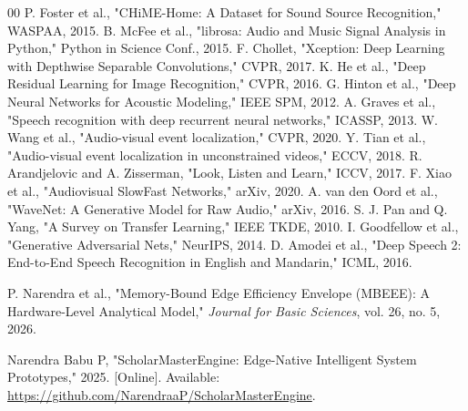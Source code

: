 \documentclass[conference]{IEEEtran}
\begin{document}
\begin{thebibliography}{00}
 P. Foster et al., "CHiME-Home: A Dataset for Sound Source Recognition," WASPAA, 2015.
 B. McFee et al., "librosa: Audio and Music Signal Analysis in Python," Python in Science Conf., 2015.
 F. Chollet, "Xception: Deep Learning with Depthwise Separable Convolutions," CVPR, 2017.
 K. He et al., "Deep Residual Learning for Image Recognition," CVPR, 2016.
 G. Hinton et al., "Deep Neural Networks for Acoustic Modeling," IEEE SPM, 2012.
 A. Graves et al., "Speech recognition with deep recurrent neural networks," ICASSP, 2013.
 W. Wang et al., "Audio-visual event localization," CVPR, 2020.
 Y. Tian et al., "Audio-visual event localization in unconstrained videos," ECCV, 2018.
 R. Arandjelovic and A. Zisserman, "Look, Listen and Learn," ICCV, 2017.
 F. Xiao et al., "Audiovisual SlowFast Networks," arXiv, 2020.
 A. van den Oord et al., "WaveNet: A Generative Model for Raw Audio," arXiv, 2016.
 S. J. Pan and Q. Yang, "A Survey on Transfer Learning," IEEE TKDE, 2010.
 I. Goodfellow et al., "Generative Adversarial Nets," NeurIPS, 2014.
 D. Amodei et al., "Deep Speech 2: End-to-End Speech Recognition in English and Mandarin," ICML, 2016.

 P. Narendra et al., "Memory-Bound Edge Efficiency Envelope (MBEEE): A Hardware-Level Analytical Model," \textit{Journal for Basic Sciences}, vol. 26, no. 5, 2026.

Narendra Babu P, "ScholarMasterEngine: Edge-Native Intelligent System Prototypes," 2025. [Online]. Available: \url{https://github.com/NarendraaP/ScholarMasterEngine}.

\end{thebibliography}
\end{document}
